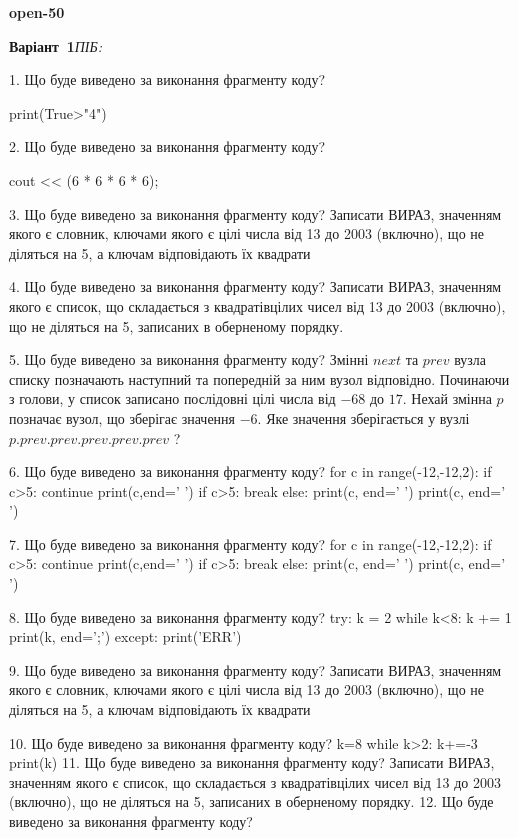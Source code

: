\documentclass[11pt]{article}
\begin{document}
{\large\textbf{open-50}}

\textbf{Варіант \No\,1}\hfill \textit{ПІБ:}\,\underline{\hspace{60mm}}
\vspace{4mm}

1. Що буде виведено за виконання фрагменту коду?

print(True>"4")

2. Що буде виведено за виконання фрагменту коду?

cout << (6 * 6 * 6 * 6);

3. Що буде виведено за виконання фрагменту коду?
Записати ВИРАЗ, значенням якого є словник, ключами якого є цілі числа від 13 до 2003 (включно), що не діляться на 5, а ключам відповідають їх квадрати 

4. Що буде виведено за виконання фрагменту коду?
Записати ВИРАЗ, значенням якого є список, що складається з квадратівцілих чисел від 13 до 2003 (включно), що не діляться на 5, записаних в обернено\-му порядку.

5. Що буде виведено за виконання фрагменту коду?
Змінні $next$ та $prev$ вузла списку позначають наступний та попередній за ним вузол відповідно. Починаючи з голови, у список записано послідовні цілі числа від $-68$ до $17$. Нехай змінна $p$ позначає вузол, що зберігає значення $-6$.
Яке значення зберігається у вузлі $p.prev.prev.prev.prev.prev$ ?

6. Що буде виведено за виконання фрагменту коду?
for c in range(-12,-12,2):
    if c>5:
        continue
        print(c,end=' ')
    if c>5:
        break
else:
    print(c, end=' ')
print(c, end=' ')

7. Що буде виведено за виконання фрагменту коду?
for c in range(-12,-12,2):
    if c>5:
        continue
        print(c,end=' ')
    if c>5:
        break
else:
    print(c, end=' ')
print(c, end=' ')

8. Що буде виведено за виконання фрагменту коду?
try:
    k = 2
    while k<8:
        k += 1
    print(k, end=';')
except:
    print('ERR')

9. Що буде виведено за виконання фрагменту коду?
Записати ВИРАЗ, значенням якого є словник, ключами якого є цілі числа від 13 до 2003 (включно), що не діляться на 5, а ключам відповідають їх квадрати 

10. Що буде виведено за виконання фрагменту коду?
k=8
   while k>2: k+=-3
   print(k)
11. Що буде виведено за виконання фрагменту коду?
Записати ВИРАЗ, значенням якого є список, що складається з квадратівцілих чисел від 13 до 2003 (включно), що не діляться на 5, записаних в оберненому порядку.
12. Що буде виведено за виконання фрагменту коду?
\end{document}
